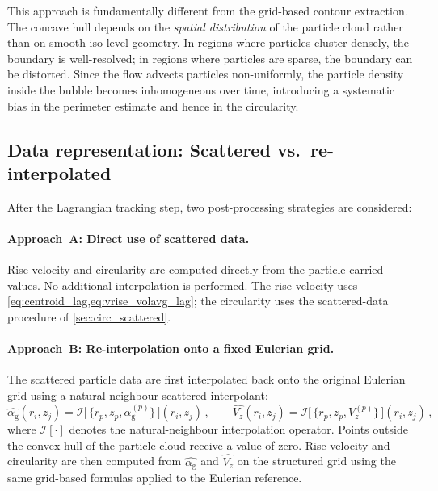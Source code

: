 \documentclass[11pt,a4paper]{article}
\newcommand{\alphag}{\alpha_{\mathrm{g}}}
\newcommand{\Vz}{V_z}
\begin{document}
This approach is fundamentally different from the grid-based contour
extraction.  The concave hull depends on the \emph{spatial distribution} of
the particle cloud rather than on smooth iso-level geometry.  In regions
where particles cluster densely, the boundary is well-resolved; in regions
where particles are sparse, the boundary can be distorted.  Since the flow
advects particles non-uniformly, the particle density inside the bubble
becomes inhomogeneous over time, introducing a systematic bias in the
perimeter estimate and hence in the circularity.


\subsection{Data representation: Scattered vs.\ re-interpolated}
\label{sec:data_repr}

After the Lagrangian tracking step, two post-processing strategies are
considered:

\paragraph{Approach~A: Direct use of scattered data.}
Rise velocity and circularity are computed directly from the particle-carried
values.  No additional interpolation is performed.  The rise velocity uses
\cref{eq:centroid_lag,eq:vrise_volavg_lag}; the circularity uses the
scattered-data procedure of \cref{sec:circ_scattered}.

\paragraph{Approach~B: Re-interpolation onto a fixed Eulerian grid.}
The scattered particle data are first interpolated back onto the original
Eulerian grid using a natural-neighbour scattered interpolant:
\begin{equation}\label{eq:reinterp}
  \hat{\alphag}(r_i,z_j) = \mathcal{I}\bigl[\,
    \{r_p, z_p, \alphag^{(p)}\}\,\bigr](r_i,z_j)\,,
  \qquad
  \hat{\Vz}(r_i,z_j) = \mathcal{I}\bigl[\,
    \{r_p, z_p, \Vz^{(p)}\}\,\bigr](r_i,z_j)\,,
\end{equation}
where $\mathcal{I}[\cdot]$ denotes the natural-neighbour interpolation
operator.  Points outside the convex hull of the particle cloud receive a
value of zero.  Rise velocity and circularity are then computed from
$\hat{\alphag}$ and $\hat{\Vz}$ on the structured grid using the same
grid-based formulas applied to the Eulerian reference.
\end{document}
